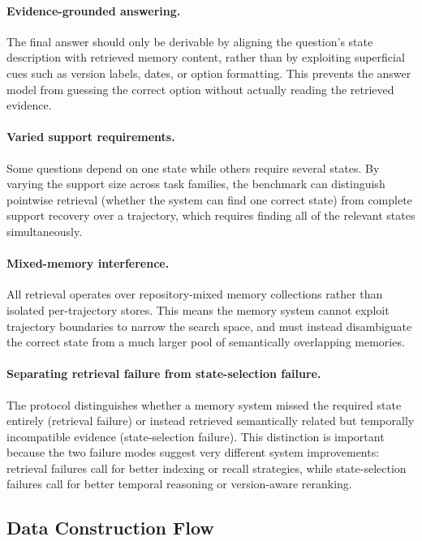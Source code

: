 \paragraph{Evidence-grounded answering.}
The final answer should only be derivable by aligning the question's state description with retrieved memory content, rather than by exploiting superficial cues such as version labels, dates, or option formatting. This prevents the answer model from guessing the correct option without actually reading the retrieved evidence.

\paragraph{Varied support requirements.}
Some questions depend on one state while others require several states. By varying the support size across task families, the benchmark can distinguish pointwise retrieval (whether the system can find one correct state) from complete support recovery over a trajectory, which requires finding all of the relevant states simultaneously.

\paragraph{Mixed-memory interference.}
All retrieval operates over repository-mixed memory collections rather than isolated per-trajectory stores. This means the memory system cannot exploit trajectory boundaries to narrow the search space, and must instead disambiguate the correct state from a much larger pool of semantically overlapping memories.

\paragraph{Separating retrieval failure from state-selection failure.}
The protocol distinguishes whether a memory system missed the required state entirely (retrieval failure) or instead retrieved semantically related but temporally incompatible evidence (state-selection failure). This distinction is important because the two failure modes suggest very different system improvements: retrieval failures call for better indexing or recall strategies, while state-selection failures call for better temporal reasoning or version-aware reranking.

\subsection{Data Construction Flow}

